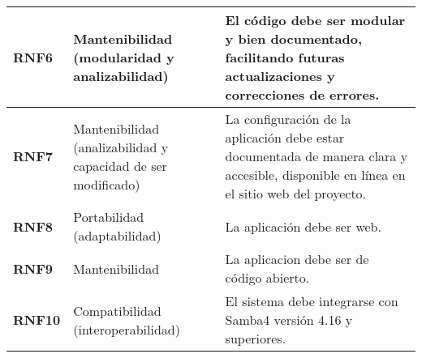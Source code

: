 \begin{longtable}{|l|p{4cm}|p{10cm}|}
    \textbf{RNF6}   & Mantenibilidad (modularidad y analizabilidad)                 & El código debe ser modular y bien documentado, facilitando futuras actualizaciones y correcciones de errores.                                      \\ \hline
    \textbf{RNF7}   & Mantenibilidad (analizabilidad y capacidad de ser modificado) & La configuración de la aplicación debe estar documentada de manera clara y accesible, disponible en línea en el sitio web del proyecto.            \\ \hline
    \textbf{RNF8}   & Portabilidad (adaptabilidad)                                  & La aplicación debe ser web.                                                                                                                        \\ \hline
    \textbf{RNF9}   & Mantenibilidad                                                & La aplicacion debe ser de código abierto.                                                                                                          \\ \hline
    \textbf{RNF10}  & Compatibilidad (interoperabilidad)                            & El sistema debe integrarse con Samba4 versión 4.16 y superiores.                                                                                   \\ \hline
\end{longtable}
